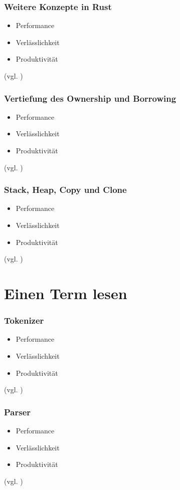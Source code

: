 \documentclass{beamer}
\begin{document}
\begin{frame}[fragile]
  \frametitle{Weitere Konzepte in Rust}
  \begin{itemize}
    \item Performance
    \pause
    \item Verlässlichkeit
    \pause
    \item Produktivität
  \end{itemize}
  {\small (vgl. \cite{WhyRust})}
\end{frame}

\begin{frame}[fragile]
  \frametitle{Vertiefung des Ownership und Borrowing}
  \begin{itemize}
    \item Performance
    \pause
    \item Verlässlichkeit
    \pause
    \item Produktivität
  \end{itemize}
  {\small (vgl. \cite{WhyRust})}
\end{frame}

\begin{frame}[fragile]
  \frametitle{Stack, Heap, Copy und Clone}
  \begin{itemize}
    \item Performance
    \pause
    \item Verlässlichkeit
    \pause
    \item Produktivität
  \end{itemize}
  {\small (vgl. \cite{WhyRust})}
\end{frame}

\section{Einen Term lesen}
\begin{frame}[fragile]
  \frametitle{Tokenizer}
  \begin{itemize}
    \item Performance
    \pause
    \item Verlässlichkeit
    \pause
    \item Produktivität
  \end{itemize}
  {\small (vgl. \cite{WhyRust})}
\end{frame}

\begin{frame}[fragile]
  \frametitle{Parser}
  \begin{itemize}
    \item Performance
    \pause
    \item Verlässlichkeit
    \pause
    \item Produktivität
  \end{itemize}
  {\small (vgl. \cite{WhyRust})}
\end{frame}
\end{document}
